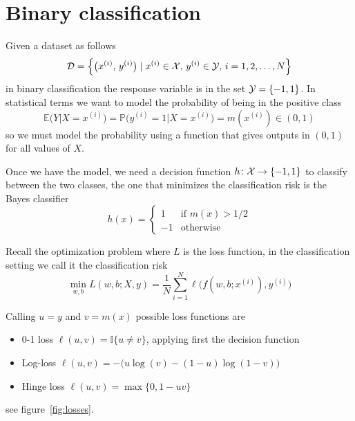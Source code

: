 \section{Binary classification}\label{sc:classification}

Given a dataset as follows
\[
\mathcal{D}=\Bigl\{\bigl(x^{(i)},\,y^{(i)}\bigr)\mid x^{(i)}\in\mathcal{X},\,y^{(i)}\in\mathcal{Y},\,i=1,2,\dots,N\Bigr\}
\]
in binary classification the response variable is in the set $\mathcal{Y}=\{-1,1\}$. In statistical terms we want to model the probability of being in the positive class
\[
\mathbb{E}\bigl(Y\lvert X=x^{(i)}\bigr)=\mathbb{P}\bigl(y^{(i)}=1\lvert X=x^{(i)}\bigr)=m(x^{(i)})\in(0,1)
\]
so we must model the probability using a function that gives outputs in $(0,1)$ for all values of $X$.

Once we have the model, we need a decision function $h\colon\mathcal{X}\to\{-1,1\}$ to classify between the two classes, the one that minimizes the classification risk is the Bayes classifier
\[
h(x)=
\begin{cases}
1 & \text{if $m(x)>1/2$} \\
-1 & \text{otherwise}
\end{cases}
\]


Recall the optimization problem where $L$ is the loss function, in the classification setting we call it the classification risk
\[
\min_{w,b}L(w,b;X,y)=\frac{1}{N}\sum_{i=1}^N\ell\bigl(f(w,b;x^{(i)}),y^{(i)}\bigr)
\]

Calling $u=y$ and $v=m(x)$ possible loss functions are

\begin{itemize}
\item 0-1 loss $\ell(u,v)=\mathbb{I}\{u\neq v\}$, applying first the decision function
\item Log-loss $\ell(u,v)=-\bigl(u\log(v)-(1-u)\log(1-v)\bigr)$
\item Hinge loss $\ell(u,v)=\max\{0,1-uv\}$
\end{itemize}
see figure~\vref{fig:losses}.


